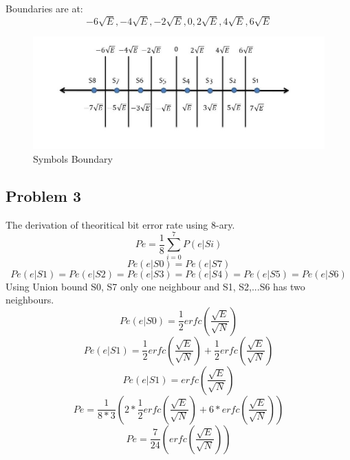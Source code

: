 \documentclass[a4paper,12pt]{report}
\begin{document}
        Boundaries are at:
        \begin{equation*}
            -6 \sqrt{E}, -4 \sqrt{E}, -2 \sqrt{E}, 0, 2 \sqrt{E}, 4 \sqrt{E}, 6 \sqrt{E}
        \end{equation*}
        \vspace{-1cm}
        \begin{figure}[h!]
            \includegraphics[width=\linewidth]{Figures/Figure_2.jpg}
            \caption{Symbols Boundary}
            \label{fig:Symbols}
        \end{figure}

    \vspace{1cm}

    \subsection{Problem 3}
        The derivation of theoritical bit error rate using 8-ary.
        \begin{equation}
            Pe = \frac{1}{8} \displaystyle\sum_{i=0}^{7} P(e|Si) 
        \end{equation}
        \begin{equation}
            Pe(e|S0) = Pe(e|S7)
        \end{equation}
        \begin{equation}
            Pe(e|S1) = Pe(e|S2) = Pe(e|S3) = Pe(e|S4) = Pe(e|S5) = Pe(e|S6)
        \end{equation}
        Using Union bound S0, S7 only one neighbour and S1, S2,...S6 has two neighbours.
        \begin{equation}
            Pe(e|S0) = \frac{1}{2} erfc(\frac{\sqrt{E}}{\sqrt{N}})
        \end{equation}
        \begin{equation}
            Pe(e|S1) = \frac{1}{2} erfc(\frac{\sqrt{E}}{\sqrt{N}})
                + \frac{1}{2} erfc(\frac{\sqrt{E}}{\sqrt{N}})
        \end{equation}
        \begin{equation}
            Pe(e|S1) = erfc(\frac{\sqrt{E}}{\sqrt{N}})
        \end{equation}
        \begin{equation}
            Pe = \frac{1}{8 * 3} (2 * \frac{1}{2} erfc(\frac{\sqrt{E}}{\sqrt{N}}) 
                + 6 * erfc(\frac{\sqrt{E}}{\sqrt{N}}))
        \end{equation}
        \begin{equation}
            Pe = \frac{7}{24} (erfc(\frac{\sqrt{E}}{\sqrt{N}}))
        \end{equation}
\end{document}
